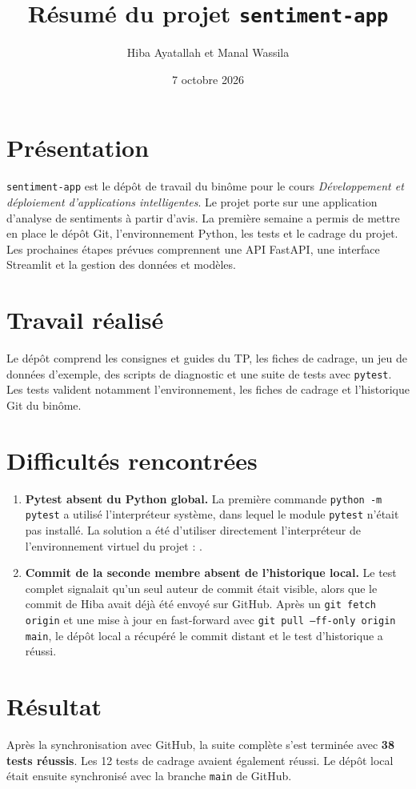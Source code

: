 \documentclass[11pt,a4paper]{article}
\title{Résumé du projet \texttt{sentiment-app}}
\author{Hiba Ayatallah et Manal Wassila}
\date{7 octobre 2026}
\begin{document}
\maketitle

\section{Présentation}

\texttt{sentiment-app} est le dépôt de travail du binôme pour le cours
\emph{Développement et déploiement d'applications intelligentes}. Le projet
porte sur une application d'analyse de sentiments à partir d'avis. La première
semaine a permis de mettre en place le dépôt Git, l'environnement Python, les
tests et le cadrage du projet. Les prochaines étapes prévues comprennent une API
FastAPI, une interface Streamlit et la gestion des données et modèles.

\section{Travail réalisé}

Le dépôt comprend les consignes et guides du TP, les fiches de cadrage, un jeu
de données d'exemple, des scripts de diagnostic et une suite de tests avec
\texttt{pytest}. Les tests valident notamment l'environnement, les fiches de
cadrage et l'historique Git du binôme.

\section{Difficultés rencontrées}

\begin{enumerate}[leftmargin=*]
    \item \textbf{Pytest absent du Python global.} La première commande
    \texttt{python -m pytest} a utilisé l'interpréteur système, dans lequel le
    module \texttt{pytest} n'était pas installé. La solution a été d'utiliser
    directement l'interpréteur de l'environnement virtuel du projet :
    \texttt{}.

    \item \textbf{Commit de la seconde membre absent de l'historique local.}
    Le test complet signalait qu'un seul auteur de commit était visible,
    alors que le commit de Hiba avait déjà été envoyé sur GitHub. Après un
    \texttt{git fetch origin} et une mise à jour en fast-forward avec
    \texttt{git pull --ff-only origin main}, le dépôt local a récupéré le
    commit distant et le test d'historique a réussi.
\end{enumerate}

\section{Résultat}

Après la synchronisation avec GitHub, la suite complète s'est terminée avec
\textbf{38 tests réussis}. Les 12 tests de cadrage avaient également réussi.
Le dépôt local était ensuite synchronisé avec la branche \texttt{main} de
GitHub.
\end{document}
